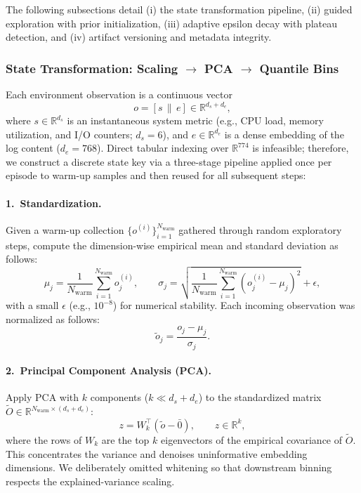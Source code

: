 The following subsections detail (i) the state transformation pipeline, (ii) guided exploration with prior initialization, (iii) adaptive epsilon decay with plateau detection, and (iv) artifact versioning and metadata integrity.
\subsubsection{State Transformation: Scaling $\rightarrow$ PCA $\rightarrow$ Quantile Bins}
\label{subsubsec:qlearn-state}

Each environment observation is a continuous vector
\[
o = [s \,\|\, e] \in \mathbb{R}^{d_s + d_e},
\]
where $s \in \mathbb{R}^{d_s}$ is an instantaneous system metric (e.g., CPU load, memory utilization, and I/O counters; $d_s=6$), and $e \in \mathbb{R}^{d_e}$ is a dense embedding of the log content ($d_e=768$). Direct tabular indexing over $\mathbb{R}^{774}$ is infeasible; therefore, we construct a discrete state key via a three-stage pipeline applied once per episode to warm-up samples and then reused for all subsequent steps:

\paragraph{1.\ Standardization.}
Given a warm-up collection $\{o^{(i)}\}_{i=1}^{N_{\text{warm}}}$ gathered through random exploratory steps, compute the dimension-wise empirical mean and standard deviation as follows:
\[
\mu_j = \frac{1}{N_{\text{warm}}} \sum_{i=1}^{N_{\text{warm}}} o^{(i)}_j,
\qquad
\sigma_j = \sqrt{\frac{1}{N_{\text{warm}}} \sum_{i=1}^{N_{\text{warm}}} (o^{(i)}_j - \mu_j)^2} + \epsilon,
\]
with a small $\epsilon$ (e.g., $10^{-8}$) for numerical stability. Each incoming observation was normalized as follows:
\[
\tilde{o}_j = \frac{o_j - \mu_j}{\sigma_j}.
\]

\paragraph{2.\ Principal Component Analysis (PCA).}
Apply PCA with $k$ components ($k \ll d_s + d_e$) to the standardized matrix $\tilde{O} \in \mathbb{R}^{N_{\text{warm}} \times (d_s + d_e)}$:
\[
z = W_k^\top (\tilde{o} - \bar{0}), \qquad z \in \mathbb{R}^{k},
\]
where the rows of $W_k$ are the top $k$ eigenvectors of the empirical covariance of $\tilde{O}$. This concentrates the variance and denoises uninformative embedding dimensions. We deliberately omitted whitening so that downstream binning respects the explained-variance scaling.

